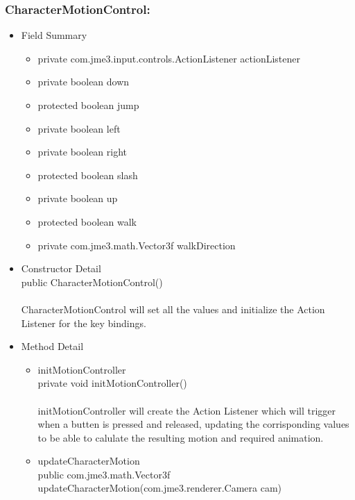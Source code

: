\documentclass[letterpaper]{article}
\begin{document}
				\subsubsection*{CharacterMotionControl:}
				\vspace{0.1in}
					\begin{itemize}
						\item	Field Summary
								\begin{itemize}
									\item	private com.jme3.input.controls.ActionListener	actionListener 
									\item	private boolean	down 
									\item	protected boolean	jump 
									\item	private boolean	left 
									\item	private boolean	right 
									\item	protected boolean	slash 
									\item	private boolean	up 
									\item	protected boolean	walk 
									\item	private com.jme3.math.Vector3f	walkDirection 
								\end{itemize}
						\item	Constructor Detail \\
								public CharacterMotionControl() \\ \\
								CharacterMotionControl will set all the values and initialize the Action Listener for the key bindings.
						\item	Method Detail 
								\begin{itemize}
									\item	initMotionController \\
											private void initMotionController() \\ \\
											initMotionController will create the Action Listener which will trigger when a butten is pressed and released, updating the corrisponding values to be able to calulate the resulting motion and required animation.
									\item	updateCharacterMotion \\
											public com.jme3.math.Vector3f updateCharacterMotion(com.jme3.renderer.Camera cam) \\ \\

\end{itemize}
\end{itemize}
\end{document}

